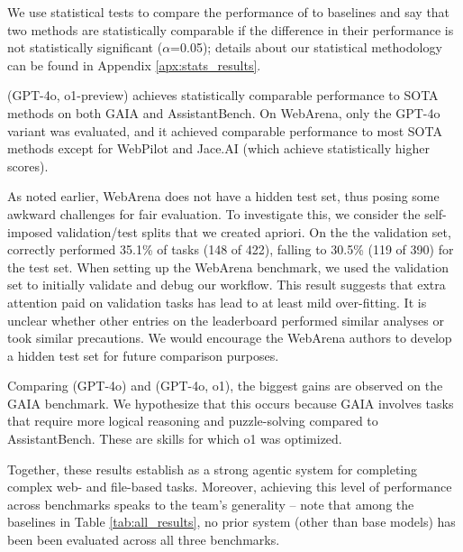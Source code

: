 We use statistical tests to compare the performance of \team to baselines and say that two methods are statistically comparable if the difference in their performance is not statistically significant ($\alpha$=0.05); details about our statistical methodology can be found in Appendix \ref{apx:stats_results}.

\team (GPT-4o, o1-preview) achieves statistically comparable performance to SOTA methods on both GAIA and AssistantBench. On WebArena, only the GPT-4o variant was evaluated\footnotemark[12], and it achieved comparable performance to most SOTA methods except for WebPilot \cite{zhang2024webpilotversatileautonomousmultiagent} and Jace.AI (which achieve statistically higher scores).

As noted earlier, WebArena does not have a hidden test set, thus posing some awkward challenges for fair evaluation. To investigate this, we consider the self-imposed validation/test splits that we created apriori. On the the validation set, \team{} correctly performed 35.1\% of tasks (148 of 422), falling to 30.5\% (119 of 390) for the test set. When setting up the WebArena benchmark, we used the validation set to initially validate and debug our workflow. This result suggests that extra attention paid on validation tasks has lead to at least mild over-fitting. It is unclear whether other entries on the leaderboard performed similar analyses or took similar precautions. We would encourage the WebArena authors to develop a hidden test set for future comparison purposes. 

Comparing \team (GPT-4o) and \team (GPT-4o, o1), the biggest gains are observed on the GAIA benchmark. We hypothesize that this occurs because GAIA involves tasks that require more logical reasoning and puzzle-solving compared to AssistantBench. These are skills for which o1 was optimized.

Together, these results establish \team as a strong agentic system for completing complex web- and file-based tasks. Moreover, achieving this level of performance across benchmarks speaks to the team's generality -- note that among the baselines in Table \ref{tab:all_results}, no prior system (other than base models) has been been evaluated across all three benchmarks. 

